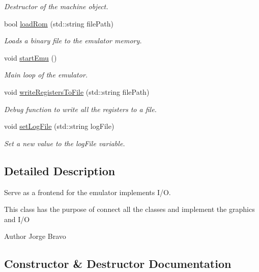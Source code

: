 \begin{DoxyCompactItemize}
\begin{DoxyCompactList}\small\item\em Destructor of the machine object. \end{DoxyCompactList}\item 
bool \hyperlink{classmachine_ac9e718bc1fab3de88185dc2a82af84c3}{load\+Rom} (std\+::string file\+Path)
\begin{DoxyCompactList}\small\item\em Loads a binary file to the emulator memory. \end{DoxyCompactList}\item 
void \hyperlink{classmachine_a07bad454d011757513fdf02188569724}{start\+Emu} ()
\begin{DoxyCompactList}\small\item\em Main loop of the emulator. \end{DoxyCompactList}\item 
void \hyperlink{classmachine_a5f5d618e02d77f66ec6e402c60fbc867}{write\+Registers\+To\+File} (std\+::string file\+Path)
\begin{DoxyCompactList}\small\item\em Debug function to write all the registers to a file. \end{DoxyCompactList}\item 
void \hyperlink{classmachine_ae73693bba05600283dc66895e2c8420d}{set\+Log\+File} (std\+::string log\+File)
\begin{DoxyCompactList}\small\item\em Set a new value to the log\+File variable. \end{DoxyCompactList}\end{DoxyCompactItemize}


\subsection{Detailed Description}
Serve as a frontend for the emulator implements I/O. 

This class has the purpose of connect all the classes and implement the graphics and I/O

\begin{DoxyAuthor}{Author}
Jorge Bravo 
\end{DoxyAuthor}


\subsection{Constructor \& Destructor Documentation}
